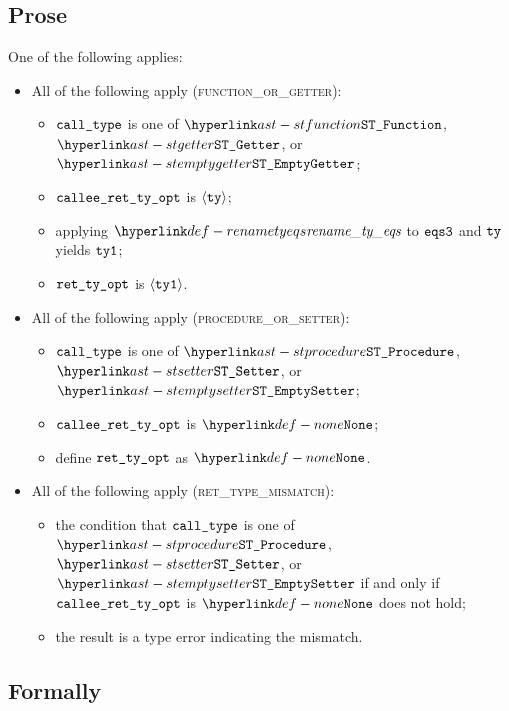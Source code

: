 \subsection{Prose}
One of the following applies:
\begin{itemize}
  \item All of the following apply (\textsc{function\_or\_getter}):
  \begin{itemize}
    \item $\calltype$ is one of $\STFunction$, $\STGetter$, or $\STEmptyGetter$;
    \item $\calleerettyopt$ is $\langle\tty\rangle$;
    \item applying $\renametyeqs$ to $\eqsthree$ and $\tty$ yields $\ttyone$\ProseOrTypeError;
    \item $\rettyopt$ is $\langle\ttyone\rangle$.
  \end{itemize}

  \item All of the following apply (\textsc{procedure\_or\_setter}):
  \begin{itemize}
    \item $\calltype$ is one of $\STProcedure$, $\STSetter$, or $\STEmptySetter$;
    \item $\calleerettyopt$ is $\None$;
    \item define $\rettyopt$ as $\None$.
  \end{itemize}

  \item All of the following apply (\textsc{ret\_type\_mismatch}):
  \begin{itemize}
    \item the condition that $\calltype$ is one of $\STProcedure$, $\STSetter$, or \\
          $\STEmptySetter$
          if and only if $\calleerettyopt$ is $\None$ does not hold;
    \item the result is a type error indicating the mismatch.
  \end{itemize}
\end{itemize}

\subsection{Formally}
\begin{mathpar}
\end{mathpar}


